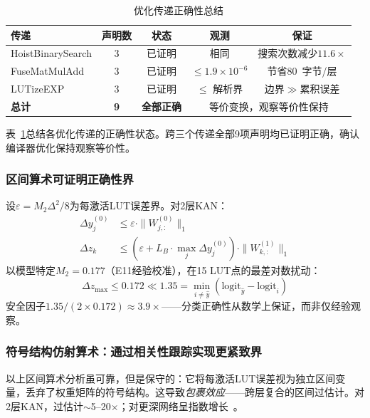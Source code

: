 \documentclass[journal,onecolumn]{IEEEtran}
\theoremstyle{definition}
\theoremstyle{plain}
\theoremstyle{remark}
\begin{document}
\begin{table}[!t]
\centering
\caption{优化传递正确性总结}
\label{tab:opt_soundness}
\footnotesize
\begin{tabular}{@{}lcccc@{}}
\toprule
\textbf{传递} & \textbf{声明数} & \textbf{状态} & \textbf{观测} & \textbf{保证} \\
\midrule
HoistBinarySearch & 3 & 已证明 & 相同 & 搜索次数减少$11.6\times$ \\
FuseMatMulAdd    & 3 & 已证明 & $\leq 1.9{\times}10^{-6}$ & 节省80~字节/层 \\
LUTizeEXP       & 3 & 已证明 & $\leq$ 解析界 & 边界$\gg$累积误差 \\
\midrule
\textbf{总计}  & \textbf{9} & \textbf{全部正确} & \multicolumn{2}{c}{等价变换，观察等价性保持} \\
\bottomrule
\end{tabular}
\end{table}

表~\ref{tab:opt_soundness}总结各优化传递的正确性状态。跨三个传递全部9项声明均已证明正确，确认编译器优化保持观察等价性。

\subsubsection{区间算术可证明正确性界}

设$\varepsilon = M_2\Delta^2/8$为每激活LUT误差界。对2层KAN：
\begin{align}
\Delta y^{(0)}_j &\leq \varepsilon \cdot \|W^{(0)}_{j,:}\|_1 \label{eq:ia_l0}\\
\Delta z_k &\leq (\varepsilon + L_B \cdot \max_j \Delta y^{(0)}_j) \cdot \|W^{(1)}_{k,:}\|_1 \label{eq:ia_l1}
\end{align}
以模型特定$M_2 = 0.177$（E11经验校准），在15 LUT点的最差对数扰动：
\begin{equation}
\Delta z_{\max} \leq 0.172 \ll 1.35 = \min_{i \neq \hat{y}}(\text{logit}_{\hat{y}} - \text{logit}_i)
\label{eq:margin_guarantee}
\end{equation}
安全因子$1.35 / (2 \times 0.172) \approx 3.9\times$——分类正确性从数学上保证，而非仅经验观察。

\subsubsection{符号结构仿射算术：通过相关性跟踪实现更紧致界}
\label{sec:da}

以上区间算术分析虽可靠，但是保守的：它将每激活LUT误差视为独立区间变量，丢弃了权重矩阵的符号结构。这导致\textit{包裹效应}——跨层复合的区间过估计。对2层KAN，过估计$\sim$5--20$\times$；对更深网络呈指数增长~\cite{krukowski2024doubleton}。
\end{document}
